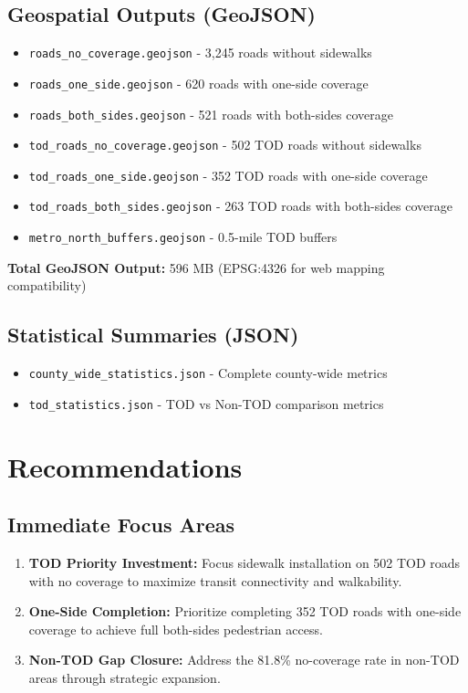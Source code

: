 \documentclass[11pt,letterpaper]{article}
\begin{document}
\subsection{Geospatial Outputs (GeoJSON)}
\begin{itemize}
    \item \texttt{roads\_no\_coverage.geojson} - 3,245 roads without sidewalks
    \item \texttt{roads\_one\_side.geojson} - 620 roads with one-side coverage
    \item \texttt{roads\_both\_sides.geojson} - 521 roads with both-sides coverage
    \item \texttt{tod\_roads\_no\_coverage.geojson} - 502 TOD roads without sidewalks
    \item \texttt{tod\_roads\_one\_side.geojson} - 352 TOD roads with one-side coverage
    \item \texttt{tod\_roads\_both\_sides.geojson} - 263 TOD roads with both-sides coverage
    \item \texttt{metro\_north\_buffers.geojson} - 0.5-mile TOD buffers
\end{itemize}

\textbf{Total GeoJSON Output:} 596 MB (EPSG:4326 for web mapping compatibility)

\subsection{Statistical Summaries (JSON)}
\begin{itemize}
    \item \texttt{county\_wide\_statistics.json} - Complete county-wide metrics
    \item \texttt{tod\_statistics.json} - TOD vs Non-TOD comparison metrics
\end{itemize}

\section{Recommendations}

\subsection{Immediate Focus Areas}
\begin{enumerate}
    \item \textbf{TOD Priority Investment:} Focus sidewalk installation on 502 TOD roads with no coverage to maximize transit connectivity and walkability.
    \item \textbf{One-Side Completion:} Prioritize completing 352 TOD roads with one-side coverage to achieve full both-sides pedestrian access.
    \item \textbf{Non-TOD Gap Closure:} Address the 81.8\% no-coverage rate in non-TOD areas through strategic expansion.
\end{enumerate}
\end{document}
